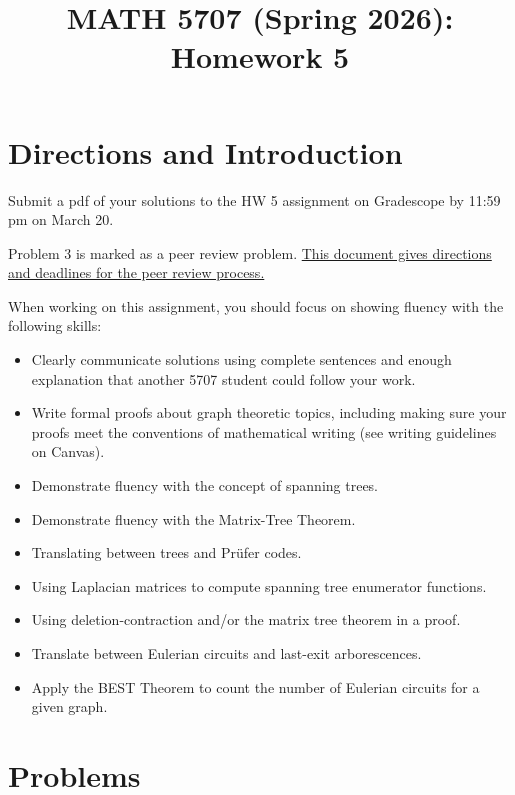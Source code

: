 \documentclass[12pt]{article}
\title{MATH 5707 (Spring 2026): Homework 5}
\date{}
\begin{document}
\vspace{-0.7in}

\maketitle
\vspace{-0.6in}


\section*{Directions and Introduction}
Submit a pdf of your solutions to the HW 5 assignment on Gradescope by 11:59 pm on March 20.

Problem 3 is marked as a peer review problem. \href{https://docs.google.com/document/d/1jSw9pmMJJFUx_6dTkcUi4k4HJNIrrIIgs9zdWhAycx0/edit?usp=sharing}{This document gives directions and deadlines for the peer review process.}

When working on this assignment, you should focus on showing fluency with the following skills:
\begin{itemize}
    \item Clearly communicate solutions using complete sentences and enough explanation that another 5707 student could follow your work.
   \item Write formal proofs about graph theoretic topics, including making sure your proofs meet the conventions of mathematical writing (see writing guidelines on Canvas).
    \item 
    Demonstrate fluency with the concept of spanning trees.
    \item Demonstrate fluency with the Matrix-Tree Theorem.
    \item Translating between trees and Pr\"ufer codes. 
    \item Using Laplacian matrices to compute spanning tree enumerator functions.
    \item Using deletion-contraction and/or the matrix tree theorem in a proof.
    \item Translate between Eulerian circuits and last-exit arborescences. 
    \item Apply the BEST Theorem to count the number of Eulerian circuits for a given graph.
\end{itemize}


\section*{Problems}
\end{document}
